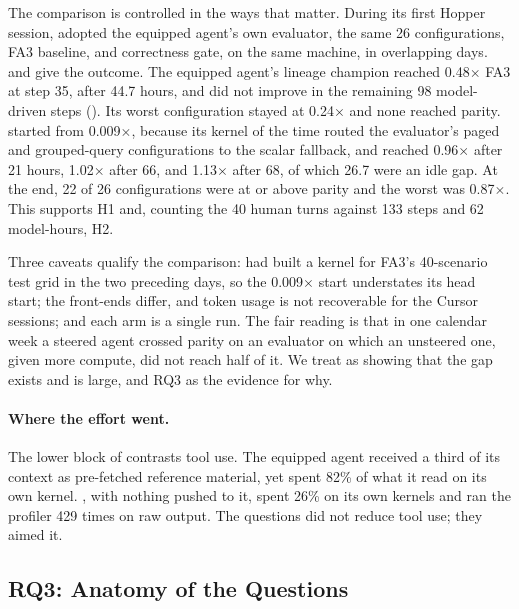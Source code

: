 The comparison is controlled in the ways that matter. During its first Hopper session, \KernelSeek adopted
the equipped agent's own evaluator, the same 26 configurations, FA3 baseline, and correctness gate,
on the same machine, in overlapping days.  and  give the
outcome. The equipped agent's lineage champion reached 0.48$\times$ FA3 at step 35, after 44.7
hours, and did not improve in the remaining 98 model-driven steps (). Its worst
configuration stayed at 0.24$\times$ and none reached parity. \KernelSeek started from 0.009$\times$,
because its kernel of the time routed the evaluator's paged and grouped-query configurations to the
scalar fallback, and reached 0.96$\times$ after 21 hours, 1.02$\times$ after 66, and 1.13$\times$
after 68, of which 26.7 were an idle gap. At the end, 22 of 26 configurations were at or above parity
and the worst was 0.87$\times$. This supports H1 and, counting the 40 human turns against 133 steps
and 62 model-hours, H2.

Three caveats qualify the comparison: \KernelSeek had built a kernel for FA3's 40-scenario test grid in
the two preceding days, so the 0.009$\times$ start understates its head start; the front-ends
differ, and token usage is not recoverable for the Cursor sessions; and each arm is a single run.
The fair reading is that in one calendar week a steered agent crossed parity on an evaluator on
which an unsteered one, given more compute, did not reach half of it. We treat 
as showing that the gap exists and is large, and RQ3 as the evidence for why.

\paragraph{Where the effort went.} The lower block of  contrasts tool use. The
equipped agent received a third of its context as pre-fetched reference material, yet spent 82\% of
what it read on its own kernel. \KernelSeek, with nothing pushed to it, spent 26\% on its own kernels and
ran the profiler 429 times on raw output. The questions did not reduce tool use; they aimed it.

\subsection{RQ3: Anatomy of the Questions}
\label{kernelseek:sec:eval-cases}

